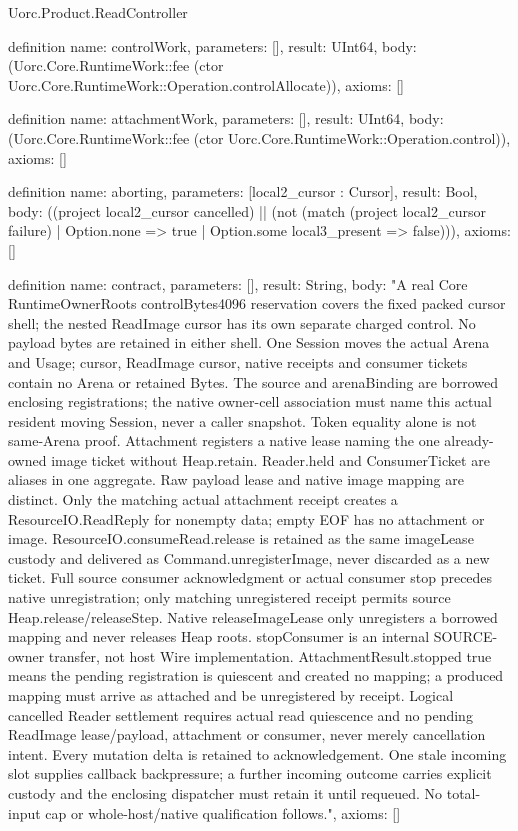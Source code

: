 \begin{lexlean}{Uorc.Product.ReadController}
\begin{semanticmodule}
definition{
  name: controlWork,
  parameters: [],
  result: UInt64,
  body: (Uorc.Core.RuntimeWork::fee (ctor Uorc.Core.RuntimeWork::Operation.controlAllocate)),
  axioms: []
}

definition{
  name: attachmentWork,
  parameters: [],
  result: UInt64,
  body: (Uorc.Core.RuntimeWork::fee (ctor Uorc.Core.RuntimeWork::Operation.control)),
  axioms: []
}

definition{
  name: aborting,
  parameters: [local2_cursor : Cursor],
  result: Bool,
  body: ((project local2_cursor cancelled) || (not (match (project local2_cursor failure)
    | Option.none => true
    | Option.some local3_present => false))),
  axioms: []
}

definition{
  name: contract,
  parameters: [],
  result: String,
  body: "A real Core RuntimeOwnerRoots controlBytes4096 reservation covers the fixed packed cursor shell; the nested ReadImage cursor has its own separate charged control. No payload bytes are retained in either shell. One Session moves the actual Arena and Usage; cursor, ReadImage cursor, native receipts and consumer tickets contain no Arena or retained Bytes. The source and arenaBinding are borrowed enclosing registrations; the native owner-cell association must name this actual resident moving Session, never a caller snapshot. Token equality alone is not same-Arena proof. Attachment registers a native lease naming the one already-owned image ticket without Heap.retain. Reader.held and ConsumerTicket are aliases in one aggregate. Raw payload lease and native image mapping are distinct. Only the matching actual attachment receipt creates a ResourceIO.ReadReply for nonempty data; empty EOF has no attachment or image. ResourceIO.consumeRead.release is retained as the same imageLease custody and delivered as Command.unregisterImage, never discarded as a new ticket. Full source consumer acknowledgment or actual consumer stop precedes native unregistration; only matching unregistered receipt permits source Heap.release/releaseStep. Native releaseImageLease only unregisters a borrowed mapping and never releases Heap roots. stopConsumer is an internal SOURCE-owner transfer, not host Wire implementation. AttachmentResult.stopped true means the pending registration is quiescent and created no mapping; a produced mapping must arrive as attached and be unregistered by receipt. Logical cancelled Reader settlement requires actual read quiescence and no pending ReadImage lease/payload, attachment or consumer, never merely cancellation intent. Every mutation delta is retained to acknowledgement. One stale incoming slot supplies callback backpressure; a further incoming outcome carries explicit custody and the enclosing dispatcher must retain it until requeued. No total-input cap or whole-host/native qualification follows.",
  axioms: []
}


\end{semanticmodule}
\end{lexlean}
